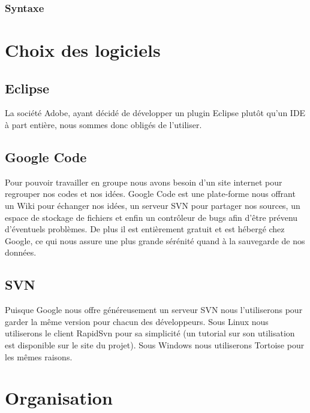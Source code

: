\documentclass{article}
\begin{document}
		\subsubsection{Syntaxe}

\newpage

\section{Choix des logiciels}
	\subsection{Eclipse}
		La société Adobe, ayant décidé de développer un plugin Eclipse plutôt qu'un IDE à part entière, nous sommes donc obligés de l'utiliser.
	\subsection{Google Code}
		Pour pouvoir travailler en groupe nous avons besoin d'un site internet pour regrouper nos codes et nos idées. Google Code est une plate-forme nous offrant un Wiki pour échanger nos idées, un serveur SVN pour partager nos sources, un espace de stockage de fichiers et enfin un contrôleur de bugs afin d'être prévenu d'éventuels problèmes.
		\ident De plus il est entièrement gratuit et est hébergé chez Google, ce qui nous assure une plus grande sérénité quand à la sauvegarde de nos données.
	\subsection{SVN}
		Puisque Google nous offre généreusement un serveur SVN nous l'utiliserons pour garder la même version pour chacun des développeurs. 
		\ident Sous Linux nous utiliserons le client RapidSvn pour sa simplicité (un tutorial sur son utilisation est disponible sur le site du projet).
		\ident Sous Windows nous utiliserons Tortoise pour les mêmes raisons.

\newpage

\section{Organisation}
\end{document}
